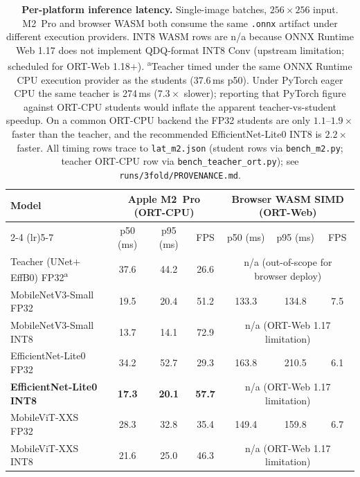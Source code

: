 \begin{table}[ht]
\centering
\caption{\textbf{Per-platform inference latency.} Single-image batches, $256{\times}256$ input. M2~Pro and browser WASM both consume the same \texttt{.onnx} artifact under different execution providers. INT8 WASM rows are n/a because ONNX Runtime Web 1.17 does not implement QDQ-format INT8 Conv (upstream limitation; scheduled for ORT-Web 1.18$+$). \textsuperscript{a}Teacher timed under the same ONNX Runtime CPU execution provider as the students (37.6\,ms p50). Under PyTorch eager CPU the same teacher is 274\,ms ($7.3\times$ slower); reporting that PyTorch figure against ORT-CPU students would inflate the apparent teacher-vs-student speedup. On a common ORT-CPU backend the FP32 students are only $1.1$--$1.9\times$ faster than the teacher, and the recommended EfficientNet-Lite0 INT8 is $2.2\times$ faster. All timing rows trace to \texttt{lat\_m2.json} (student rows via \texttt{bench\_m2.py}; teacher ORT-CPU row via \texttt{bench\_teacher\_ort.py}); see \texttt{runs/3fold/PROVENANCE.md}.}
\label{tab:t5-latency}
\small
\setlength{\tabcolsep}{5pt}
\begin{tabular}{lcccccc}
\toprule
\multirow{2}{*}{\textbf{Model}}
  & \multicolumn{3}{c}{\textbf{Apple M2~Pro (ORT-CPU)}}
  & \multicolumn{3}{c}{\textbf{Browser WASM SIMD (ORT-Web)}} \\
\cmidrule(lr){2-4} \cmidrule(lr){5-7}
  & p50 (ms) & p95 (ms) & FPS  & p50 (ms) & p95 (ms) & FPS  \\
\midrule
Teacher (UNet$+$EffB0) FP32\textsuperscript{a} & 37.6 & 44.2 & 26.6 & \multicolumn{3}{c}{n/a (out-of-scope for browser deploy)} \\
\midrule
MobileNetV3-Small FP32             &  19.5 &  20.4 & 51.2  & 133.3 & 134.8 & 7.5 \\
MobileNetV3-Small INT8             &  13.7 &  14.1 & 72.9  & \multicolumn{3}{c}{n/a (ORT-Web 1.17 limitation)} \\
EfficientNet-Lite0 FP32            &  34.2 &  52.7 & 29.3  & 163.8 & 210.5 & 6.1 \\
\textbf{EfficientNet-Lite0 INT8}   &  \textbf{17.3} & \textbf{20.1} & \textbf{57.7} & \multicolumn{3}{c}{n/a (ORT-Web 1.17 limitation)} \\
MobileViT-XXS FP32                 &  28.3 &  32.8 & 35.4  & 149.4 & 159.8 & 6.7 \\
MobileViT-XXS INT8                 &  21.6 &  25.0 & 46.3  & \multicolumn{3}{c}{n/a (ORT-Web 1.17 limitation)} \\
\bottomrule
\end{tabular}
\end{table}
